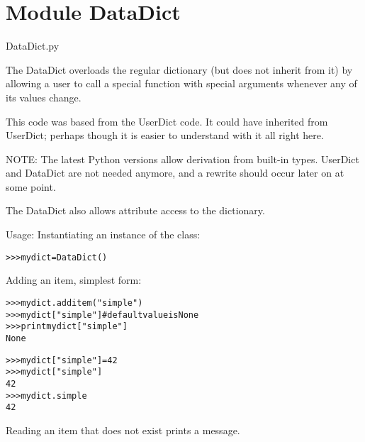 %
%
%


\section{Module DataDict}

    \label{DataDict}
DataDict.py

The DataDict overloads the regular dictionary (but does not inherit from 
it) by allowing a user to call a special function with special arguments 
whenever any of its values change.

This code was based from the UserDict code.  It could have inherited from 
UserDict; perhaps though it is easier to understand with it all right here.

NOTE: The latest Python versions allow derivation from built-in types. 
UserDict and DataDict are not needed anymore, and a rewrite should occur 
later on at some point.

The DataDict also allows attribute access to the dictionary.

Usage: Instantiating an instance of the class:

\begin{alltt}
{\textgreater}{\textgreater}{\textgreater} mydict = DataDict()\end{alltt}

Adding an item, simplest form:

\begin{alltt}
{\textgreater}{\textgreater}{\textgreater} mydict.additem("simple")
{\textgreater}{\textgreater}{\textgreater} mydict["simple"] \# default value is None
{\textgreater}{\textgreater}{\textgreater} print mydict["simple"]
None\end{alltt}

\begin{alltt}
{\textgreater}{\textgreater}{\textgreater} mydict["simple"] = 42
{\textgreater}{\textgreater}{\textgreater} mydict["simple"]
42
{\textgreater}{\textgreater}{\textgreater} mydict.simple
42\end{alltt}

Reading an item that does not exist prints a message.

